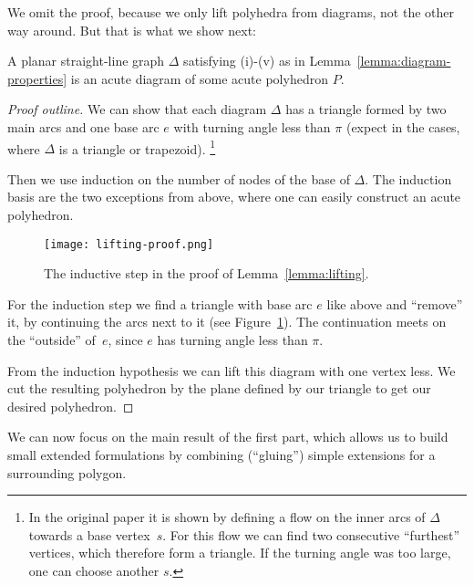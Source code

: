 We omit the proof, because we only lift polyhedra from diagrams, not the other way around. But that is what we show next:

\begin{lemma}\label{lemma:lifting}
  A planar straight-line graph $\Delta$ satisfying (i)-(v) as in Lemma~\ref{lemma:diagram-properties} is an acute diagram of some acute polyhedron $P$.
\end{lemma}

\begin{proof}[Proof outline]
  We can show that each diagram $\Delta$ has a triangle formed by two main arcs and one base arc $e$ with turning angle less than $\pi$ (expect in the cases, where $\Delta$ is a triangle or trapezoid). \footnote{In the original paper it is shown by defining a flow on the inner arcs of $\Delta$ towards a base vertex~$s$. For this flow we can find two consecutive ``furthest'' vertices, which therefore form a triangle. If the turning angle was too large, one can choose another $s$.}

  Then we use induction on the number of nodes of the base of $\Delta$. The induction basis are the two exceptions from above, where one can easily construct an acute polyhedron.

  \begin{figure}[ht]
    \centering
    \texttt{[image: lifting-proof.png]}
    \caption{The inductive step in the proof of Lemma~\ref{lemma:lifting}. \cite[Figure 2]{shitov2020sublinear}}
    \label{fig:lifting-proof}
  \end{figure}

  For the induction step we find a triangle with base arc $e$ like above and ``remove'' it, by continuing the arcs next to it (see Figure~\ref{fig:lifting-proof}). The continuation meets on the ``outside'' of~$e$, since $e$ has turning angle less than $\pi$.

  From the induction hypothesis we can lift this diagram with one vertex less. We cut the resulting polyhedron by the plane defined by our triangle to get our desired polyhedron.
\end{proof}

We can now focus on the main result of the first part, which allows us to build small extended formulations by combining (``gluing'') simple extensions for a surrounding polygon.

